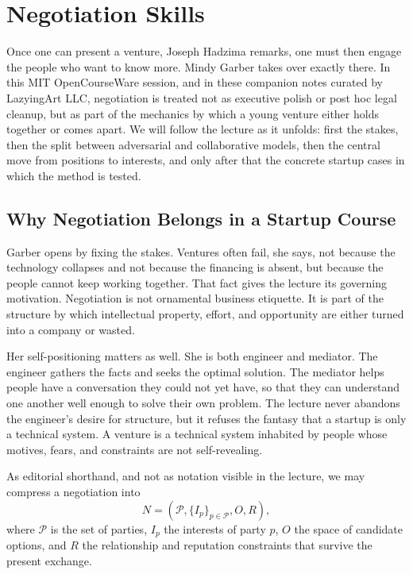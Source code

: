 \chapter{Negotiation Skills}

Once one can present a venture, Joseph Hadzima remarks, one must then engage the people who want to know more. Mindy Garber takes over exactly there. In this MIT OpenCourseWare session, and in these companion notes curated by LazyingArt LLC, negotiation is treated not as executive polish or post hoc legal cleanup, but as part of the mechanics by which a young venture either holds together or comes apart. We will follow the lecture as it unfolds: first the stakes, then the split between adversarial and collaborative models, then the central move from positions to interests, and only after that the concrete startup cases in which the method is tested.

\section{Why Negotiation Belongs in a Startup Course}

Garber opens by fixing the stakes. Ventures often fail, she says, not because the technology collapses and not because the financing is absent, but because the people cannot keep working together. That fact gives the lecture its governing motivation. Negotiation is not ornamental business etiquette. It is part of the structure by which intellectual property, effort, and opportunity are either turned into a company or wasted.

Her self-positioning matters as well. She is both engineer and mediator. The engineer gathers the facts and seeks the optimal solution. The mediator helps people have a conversation they could not yet have, so that they can understand one another well enough to solve their own problem. The lecture never abandons the engineer's desire for structure, but it refuses the fantasy that a startup is only a technical system. A venture is a technical system inhabited by people whose motives, fears, and constraints are not self-revealing.

As editorial shorthand, and not as notation visible in the lecture, we may compress a negotiation into
\begin{equation}
N = (\mathcal{P}, \{I_p\}_{p\in\mathcal{P}}, O, R),
\end{equation}
where \(\mathcal{P}\) is the set of parties, \(I_p\) the interests of party \(p\), \(O\) the space of candidate options, and \(R\) the relationship and reputation constraints that survive the present exchange.

